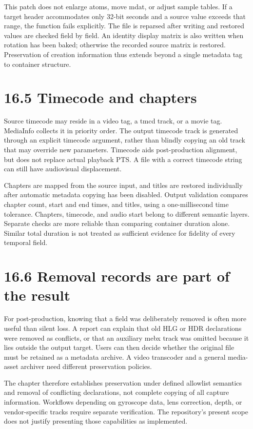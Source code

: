 \documentclass[11pt,a4paper,openany]{book}
\begin{document}
This patch does not enlarge atoms, move mdat, or adjust sample tables. If a target header accommodates only 32-bit seconds and a source value exceeds that range, the function fails explicitly. The file is reparsed after writing and restored values are checked field by field. An identity display matrix is also written when rotation has been baked; otherwise the recorded source matrix is restored. Preservation of creation information thus extends beyond a single metadata tag to container structure.


\section*{16.5 Timecode and chapters}
Source timecode may reside in a video tag, a tmcd track, or a movie tag. MediaInfo collects it in priority order. The output timecode track is generated through an explicit timecode argument, rather than blindly copying an old track that may override new parameters. Timecode aids post-production alignment, but does not replace actual playback PTS. A file with a correct timecode string can still have audiovisual displacement.

Chapters are mapped from the source input, and titles are restored individually after automatic metadata copying has been disabled. Output validation compares chapter count, start and end times, and titles, using a one-millisecond time tolerance. Chapters, timecode, and audio start belong to different semantic layers. Separate checks are more reliable than comparing container duration alone. Similar total duration is not treated as sufficient evidence for fidelity of every temporal field.


\section*{16.6 Removal records are part of the result}
For post-production, knowing that a field was deliberately removed is often more useful than silent loss. A report can explain that old HLG or HDR declarations were removed as conflicts, or that an auxiliary mebx track was omitted because it lies outside the output target. Users can then decide whether the original file must be retained as a metadata archive. A video transcoder and a general media-asset archiver need different preservation policies.

The chapter therefore establishes preservation under defined allowlist semantics and removal of conflicting declarations, not complete copying of all capture information. Workflows depending on gyroscope data, lens correction, depth, or vendor-specific tracks require separate verification. The repository's present scope does not justify presenting those capabilities as implemented.
\end{document}

